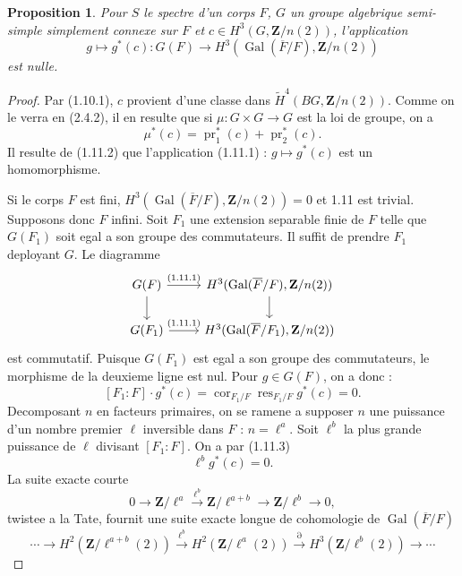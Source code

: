 \documentclass[11pt,a4paper]{article}
\theoremstyle{plain}
\newtheorem{proposition}[theorem]{Proposition}
\theoremstyle{definition}
\DeclareMathOperator{\Gal}{Gal}
\DeclareMathOperator{\pr}{pr}
\DeclareMathOperator{\cores}{cor}
\DeclareMathOperator{\res}{res}
\begin{document}
\begin{proposition}\label{1.11}
Pour $S$ le spectre d'un corps $F$, $G$ un groupe algebrique semi-simple simplement connexe sur $F$ et $c \in H^3(G, \mathbf{Z}/n(2))$, l'application
\begin{equation}\label{1.11.1}
g \mapsto g^*(c) : G(F) \to H^3(\Gal(\overline{F}/F), \mathbf{Z}/n(2))
\end{equation}
est nulle.
\end{proposition}

\begin{proof}
Par (1.10.1), $c$ provient d'une classe dans $\widetilde{H}^4(BG, \mathbf{Z}/n(2))$. Comme on le verra en (2.4.2), il en resulte que si $\mu : G \times G \to G$ est la loi de groupe, on a
\begin{equation}\label{1.11.2}
\mu^*(c) = \pr_1^*(c) + \pr_2^*(c).
\end{equation}
Il resulte de (1.11.2) que l'application (1.11.1) : $g \mapsto g^*(c)$ est un homomorphisme.

Si le corps $F$ est fini, $H^3(\Gal(\overline{F}/F), \mathbf{Z}/n(2)) = 0$ et 1.11 est trivial. Supposons donc $F$ infini. Soit $F_1$ une extension separable finie de $F$ telle que $G(F_1)$ soit egal a son groupe des commutateurs. Il suffit de prendre $F_1$ deployant $G$. Le diagramme
\[
\begin{tikzcd}
G(F) \arrow{r}{\text{(1.11.1)}} \arrow{d} & H^3(\Gal(\overline{F}/F), \mathbf{Z}/n(2)) \arrow{d} \\
G(F_1) \arrow{r}{\text{(1.11.1)}} & H^3(\Gal(\overline{F}/F_1), \mathbf{Z}/n(2))
\end{tikzcd}
\]
est commutatif. Puisque $G(F_1)$ est egal a son groupe des commutateurs, le morphisme de la deuxieme ligne est nul. Pour $g \in G(F)$, on a donc :
\begin{equation}\label{1.11.3}
[F_1 : F] \cdot g^*(c) = \cores_{F_1/F} \res_{F_1/F} g^*(c) = 0.
\end{equation}
Decomposant $n$ en facteurs primaires, on se ramene a supposer $n$ une puissance d'un nombre premier $\ell$ inversible dans $F$ : $n = \ell^a$. Soit $\ell^b$ la plus grande puissance de $\ell$ divisant $[F_1:F]$. On a par (1.11.3)
\[
\ell^b g^*(c) = 0.
\]
La suite exacte courte
\[
0 \to \mathbf{Z}/\ell^a \xrightarrow{\ell^b} \mathbf{Z}/\ell^{a+b} \to \mathbf{Z}/\ell^b \to 0,
\]
twistee a la Tate, fournit une suite exacte longue de cohomologie de $\Gal(\overline{F}/F)$
\[
\cdots \to H^2(\mathbf{Z}/\ell^{a+b}(2)) \xrightarrow{\ell^b} H^2(\mathbf{Z}/\ell^a(2)) \xrightarrow{\partial} H^3(\mathbf{Z}/\ell^b(2)) \to \cdots
\]


\end{proof}
\end{document}
